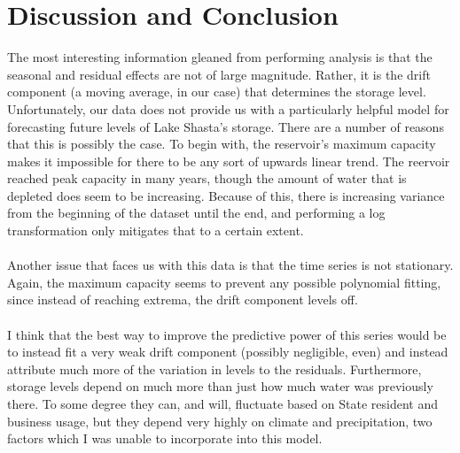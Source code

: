 \documentclass[twoside,12pt]{article}
\begin{document}
\part{Discussion and Conclusion}
The most interesting information gleaned from performing analysis is that the seasonal and residual effects are not of large magnitude. Rather, it is the drift component (a moving average, in our case) that determines the storage level.
Unfortunately, our data does not provide us with a particularly helpful model for forecasting future levels of Lake Shasta's storage. There are a number of reasons that this is possibly the case. To begin with, the reservoir's maximum capacity makes it impossible for there to be any sort of upwards linear trend. The reervoir reached peak capacity in many years, though the amount of water that is depleted does seem to be increasing. Because of this, there is increasing variance from the beginning of the dataset until the end, and performing a log transformation only mitigates that to a certain extent.\\ \\
Another issue that faces us with this data is that the time series is not stationary. Again, the maximum capacity seems to prevent any possible polynomial fitting, since instead of reaching extrema, the drift component levels off. \\ \\
I think that the best way to improve the predictive power of this series would be to instead fit a very weak drift component (possibly negligible, even) and instead attribute much more of the variation in levels to the residuals. Furthermore, storage levels depend on much more than just how much water was previously there. To some degree they can, and will, fluctuate based on State resident and business usage, but they depend very highly on climate and precipitation, two factors which I was unable to incorporate into this model.\\ \\
\pagebreak
\appendix
\end{document}

